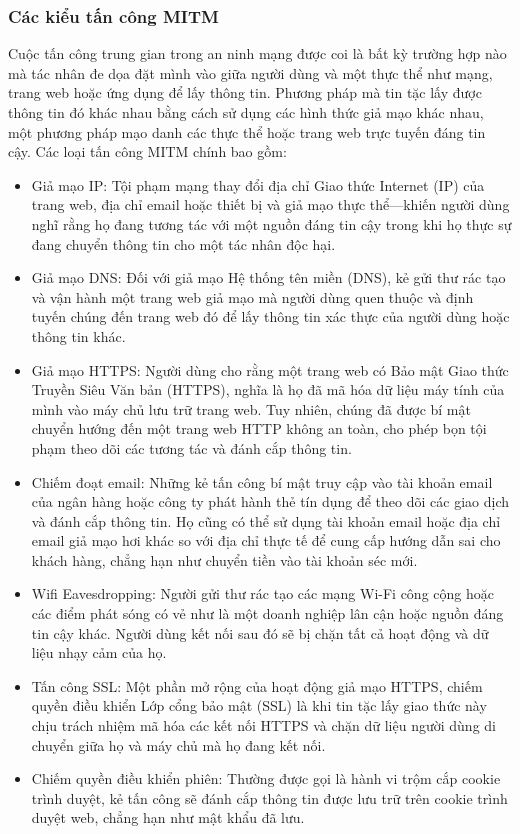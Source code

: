 \subsubsection{Các kiểu tấn công MITM}
Cuộc tấn công trung gian trong an ninh mạng được coi là bất kỳ trường hợp nào mà tác nhân đe dọa đặt mình vào giữa người dùng và một thực thể như mạng, trang web hoặc ứng dụng để lấy thông tin. Phương pháp mà tin tặc lấy được thông tin đó khác nhau bằng cách sử dụng các hình thức giả mạo khác nhau, một phương pháp mạo danh các thực thể hoặc trang web trực tuyến đáng tin cậy. Các loại tấn công MITM chính bao gồm:
\begin{itemize}
    \item Giả mạo IP: Tội phạm mạng thay đổi địa chỉ Giao thức Internet (IP) của trang web, địa chỉ email hoặc thiết bị và giả mạo thực thể—khiến người dùng nghĩ rằng họ đang tương tác với một nguồn đáng tin cậy trong khi họ thực sự đang chuyển thông tin cho một tác nhân độc hại.
    \item Giả mạo DNS: Đối với giả mạo Hệ thống tên miền (DNS), kẻ gửi thư rác tạo và vận hành một trang web giả mạo mà người dùng quen thuộc và định tuyến chúng đến trang web đó để lấy thông tin xác thực của người dùng hoặc thông tin khác.
    \item Giả mạo HTTPS: Người dùng cho rằng một trang web có Bảo mật Giao thức Truyền Siêu Văn bản (HTTPS), nghĩa là họ đã mã hóa dữ liệu máy tính của mình vào máy chủ lưu trữ trang web. Tuy nhiên, chúng đã được bí mật chuyển hướng đến một trang web HTTP không an toàn, cho phép bọn tội phạm theo dõi các tương tác và đánh cắp thông tin.
\item Chiếm đoạt email: Những kẻ tấn công bí mật truy cập vào tài khoản email của ngân hàng hoặc công ty phát hành thẻ tín dụng để theo dõi các giao dịch và đánh cắp thông tin. Họ cũng có thể sử dụng tài khoản email hoặc địa chỉ email giả mạo hơi khác so với địa chỉ thực tế để cung cấp hướng dẫn sai cho khách hàng, chẳng hạn như chuyển tiền vào tài khoản séc mới.
\item Wifi Eavesdropping: Người gửi thư rác tạo các mạng Wi-Fi công cộng hoặc các điểm phát sóng có vẻ như là một doanh nghiệp lân cận hoặc nguồn đáng tin cậy khác. Người dùng kết nối sau đó sẽ bị chặn tất cả hoạt động và dữ liệu nhạy cảm của họ.
\item Tấn công SSL: Một phần mở rộng của hoạt động giả mạo HTTPS, chiếm quyền điều khiển Lớp cổng bảo mật (SSL) là khi tin tặc lấy giao thức này chịu trách nhiệm mã hóa các kết nối HTTPS và chặn dữ liệu người dùng di chuyển giữa họ và máy chủ mà họ đang kết nối.
\item Chiếm quyền điều khiển phiên: Thường được gọi là hành vi trộm cắp cookie trình duyệt, kẻ tấn công sẽ đánh cắp thông tin được lưu trữ trên cookie trình duyệt web, chẳng hạn như mật khẩu đã lưu.
\end{itemize}
